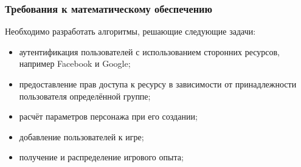 \subsubsection{Требования к математическому обеспечению}

Необходимо разработать алгоритмы, решающие следующие задачи:

\begin{itemize}
\item аутентификация пользователей с использованием сторонних ресурсов, например Facebook и Google;
\item предоставление прав доступа к ресурсу в зависимости от принадлежности пользователя определённой группе;
\item расчёт параметров персонажа при его создании;
\item добавление пользователей к игре;
\item получение и распределение игрового опыта;
\end{itemize}
